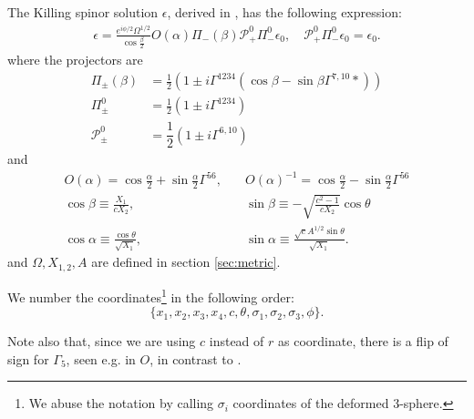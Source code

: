 
The Killing spinor solution $\epsilon$, derived in \cite{Pilch:2003jg}, has the following expression:
\begin{align}
\epsilon = \frac{e^{i\phi/2}\Omega^{1/2}}{\cos\frac{\beta}{2}}O(\alpha)
\Pi_-(\beta) \mathcal{P}_+^{0} \Pi^0_-\epsilon_0, \quad 
\mathcal{P}_+^{0} \Pi^0_-\epsilon_0 = \epsilon_0.
\end{align}
where the projectors are
\begin{align}
\Pi_\pm (\beta) &= 
\frac{1}{2}\left( 1 \pm i\Gamma^{1234} \left(\cos\beta - \sin \beta \Gamma^{7,10} * \right)\right)\\
\Pi_\pm^0 &= 
\frac{1}{2}\left(1 \pm i\Gamma^{1234}\right)\\
\mathcal{P}_{\pm}^{0} &=
\dfrac{1}{2} \left(1\pm i\Gamma^{6,10}\right)
\end{align}
and 
\begin{align}
O(\alpha) = \cos\frac{\alpha}{2} + \sin\frac{\alpha}{2}\Gamma^{5 6}, 
&\quad
O(\alpha)^{-1} = \cos\frac{\alpha}{2} - \sin\frac{\alpha}{2}\Gamma^{5 6}\\
\cos\beta \equiv \frac{X_1}{c X_2}, \quad 
&\quad
\sin\beta \equiv -\sqrt{\frac{c^2 - 1}{c X_2}}\cos\theta\\
\cos\alpha \equiv \frac{\cos\theta}{\sqrt{X_1}}, 
&\quad
\sin\alpha \equiv \frac{\sqrt{c}A^{1/2}\sin\theta}{\sqrt{X_1}}.
\end{align}
and $\Omega, X_{1,2}, A$ are defined in section \ref{sec:metric}.

We number the coordinates\footnote{We abuse the notation by calling $\sigma_i$ coordinates of the deformed 3-sphere.} in the following order:
\begin{equation}
 \{x_1, x_2, x_3, x_4, c, \theta, \sigma_1, \sigma_2, \sigma_3, \phi\}. 
\end{equation}

Note also that, since we are using $c$ instead of $r$ as coordinate, there is a flip of sign for $\Gamma_5$, seen e.g. in $O$, in contrast to \cite{Pilch:2003jg}.
